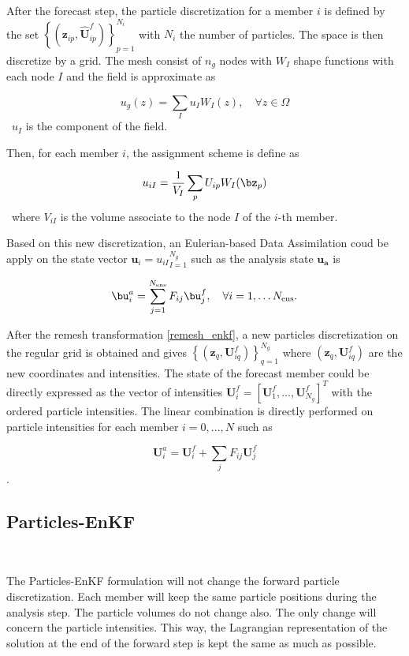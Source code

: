 After the forecast step, the particle discretization for a member $i$ is defined by the set $\left\{(\bm{z}_{ip}, \hat{\bm U}^f_{ip})\right\}_{p=1}^{N_i}$ with $N_i$ the number of particles.
The space is then discretize by a grid. The mesh consist of $n_g$ nodes with $W_I$ shape functions with each node $I$ and the field is approximate as

\begin{equation*}
  u_g(z) = \sum_I u_I W_I(z), \quad \forall z \in \Omega
\end{equation*}~$u_I$ is the component of the field.

Then, for each member $i$, the assignment scheme is define as

\begin{equation*}
  u_{iI} = \frac{1}{V_I}\sum_p U_{ip} W_I(\bz_p)
\end{equation*}~where $V_{iI}$ is the volume associate to the node $I$ of the $i$-th member.

Based on this new discretization, an Eulerian-based Data Assimilation coud be apply on the state vector $ \bm{u}_i = {u_{iI}}_{I=1}^{N_g}$ such as the analysis state $\bm{u_a}$ is

\begin{equation*}
  \bu^a_{i} =  \sum_{j=1}^{N_{\text{ens}}} F_{ij} \bu^f_{j}, \quad \forall i = 1, \dots N_{\text{ens}}.
\end{equation*}

After the remesh transformation \ref{remesh_enkf}, a new particles discretization on the regular grid is obtained and gives $\left\{(\bm{z}_q, \bm U^f_{iq})\right\}_{q=1}^{N_g}$ where $(\bm{z}_q, \bm U^f_{iq})$ are the new coordinates and intensities. The state of the forecast member could be directly expressed as the vector of intensities $\bm{U}^f_i = [\bm U^f_1,..., \bm U^f_{N_g}]^T$ with the ordered particle intensities. The linear combination is directly performed on particle intensities for each member $i = 0, \dots, N$ such as


\begin{equation*}
  \bm{U}^a_i = \bm{U}^f_i + \sum_j F_{ij} \bm{U}^f_j
\end{equation*}.


\subsection{Particles-EnKF}~\label{part_enkf}

The Particles-EnKF formulation will not change the forward particle discretization. Each member will keep the same particle positions during the analysis step. The particle volumes do not change also. The only change will concern the particle intensities. This way, the Lagrangian representation of the solution at the end of the forward step is kept the same as much as possible.

